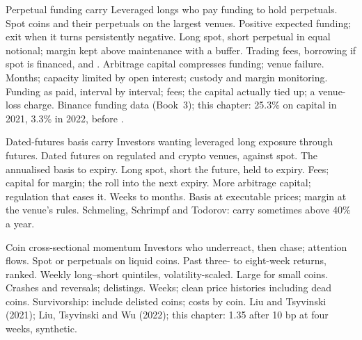 \begin{strategyfile}{Perpetual funding carry}\label{strat:s1:crypto-medium-frequency-strategies:funding}
 Leveraged longs who pay funding to hold perpetuals.
 Spot coins and their perpetuals on the largest venues.
 Positive expected funding; exit when it turns persistently negative.
 Long spot, short perpetual in equal notional; margin kept above maintenance with a buffer.
 Trading fees, borrowing if spot is financed, and .
 Arbitrage capital compresses funding; venue failure.
 Months; capacity limited by open interest; custody and margin monitoring.
 Funding as paid, interval by interval; fees; the capital actually tied up; a venue-loss charge.
 Binance funding data (Book~3); this chapter: 25.3\% on capital in 2021, 3.3\% in 2022, before .
\end{strategyfile}

\begin{strategyfile}{Dated-futures basis carry}\label{strat:s1:crypto-medium-frequency-strategies:basis}
 Investors wanting leveraged long exposure through futures.
 Dated futures on regulated and crypto venues, against spot.
 The annualised basis to expiry.
 Long spot, short the future, held to expiry.
 Fees; capital for margin; the roll into the next expiry.
 More arbitrage capital; regulation that eases it.
 Weeks to months.
 Basis at executable prices; margin at the venue's rules.
 Schmeling, Schrimpf and Todorov: carry sometimes above 40\% a year.
\end{strategyfile}

\begin{strategyfile}{Coin cross-sectional momentum}\label{strat:s1:crypto-medium-frequency-strategies:momentum}
 Investors who underreact, then chase; attention flows.
 Spot or perpetuals on liquid coins.
 Past three- to eight-week returns, ranked.
 Weekly long--short quintiles, volatility-scaled.
 Large for small coins.
 Crashes and reversals; delistings.
 Weeks; clean price histories including dead coins.
 Survivorship: include delisted coins; costs by coin.
 Liu and Tsyvinski (2021); Liu, Tsyvinski and Wu (2022); this chapter: 1.35 after 10 bp at four weeks, synthetic.
\end{strategyfile}

